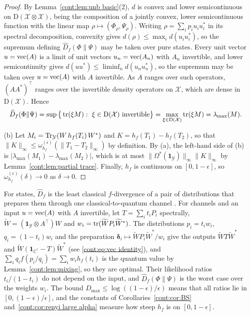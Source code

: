 \begin{proof}
 By Lemma~\ref{cont:lem:unb basic}(2), $d$ is convex and lower semicontinuous on $\mathrm{D}(\mathcal{X}\otimes\mathcal{X})$, being the composition of a jointly convex, lower semicontinuous function with the linear map $\rho\mapsto(\Phi_\rho,\Psi_\rho)$. Writing $\rho=\sum_ip_iu_iu_i^*$ in its spectral decomposition, convexity gives $d(\rho)\leq\max_id(u_iu_i^*)$, so the supremum defining $\widehat{D}_f(\Phi\|\Psi)$ may be taken over pure states. Every unit vector $u=\operatorname{vec}(A)$ is a limit of unit vectors $u_n=\operatorname{vec}(A_n)$ with $A_n$ invertible, and lower semicontinuity gives $d(uu^*)\leq\liminf_nd(u_nu_n^*)$, so the supremum may be taken over $u=\operatorname{vec}(A)$ with $A$ invertible. As $A$ ranges over such operators, $(AA^*)^\top$ ranges over the invertible density operators on $\mathcal{X}$, which are dense in $\mathrm{D}(\mathcal{X})$. Hence
\[
\widehat{D}_f(\Phi\|\Psi)=\sup\big\{\tr(\xi M):\ \xi\in\mathrm{D}(\mathcal{X})\text{ invertible}\big\}=\max_{\xi\in\mathrm{D}(\mathcal{X})}\tr(\xi M)=\lambda_{\max}(M).
\]

(b) Let $M_i=\operatorname{Tr}_{\mathcal{Y}}(W\,h_f(T_i)\,W^*)$ and $K=h_f(T_1)-h_f(T_2)$, so that $\|K\|_\infty\leq\omega^{(\epsilon)}_{h_f}(\|T_1-T_2\|_\infty)$ by definition. By (a), the left-hand side of (b) is $|\lambda_{\max}(M_1)-\lambda_{\max}(M_2)|$, which is at most $\|\Omega^*(\mathbf{1}_{\mathcal{Y}})\|_\infty\|K\|_\infty$ by Lemma~\ref{cont:lem:partial trace}. Finally, $h_f$ is continuous on $[0,1-\epsilon]$, so $\omega^{(\epsilon)}_{h_f}(\delta)\to0$ as $\delta\to0$.
\end{proof}
\begin{remark}\label{cont:rem:phys-reverse}
For states, $\widehat{D}_f$ is the least classical $f$-divergence of a pair of distributions that prepares them through one classical-to-quantum channel \cite{Matsumoto2018newf}. For channels and an input $u=\operatorname{vec}(A)$ with $A$ invertible, let $T=\sum_it_iP_i$ spectrally, $\widetilde{W}=(\mathbf{1}_{\mathcal{Y}}\otimes A^\top)W$ and $w_i=\operatorname{tr}(\widetilde{W}P_i\widetilde{W}^*)$. The distributions $p_i=t_iw_i$, $q_i=(1-t_i)w_i$ and the preparation $\boldsymbol{\delta}_i\mapsto \widetilde{W}P_i\widetilde{W}^*/w_i$ give the outputs $\widetilde{W}T\widetilde{W}^*$ and $\widetilde{W}(\mathbf{1}_{\mathbb{C}^r}-T)\widetilde{W}^*$ (see \eqref{cont:eq:vec identity}), and $\sum_iq_if(p_i/q_i)=\sum_iw_ih_f(t_i)$ is the quantum value by Lemma~\ref{cont:lem:mixing}, so they are optimal. Their likelihood ratios $t_i/(1-t_i)$ do not depend on the input, and $\widehat{D}_f(\Phi\|\Psi)$ is the worst case over the weights $w_i$. The bound $D_{\max}\leq\log((1-\epsilon)/\epsilon)$ means that all ratios lie in $[0,(1-\epsilon)/\epsilon]$, and the constants of Corollaries~\ref{cont:cor:BS} and~\ref{cont:cor:renyi large alpha} measure how steep $h_f$ is on $[0,1-\epsilon]$.
\end{remark}

